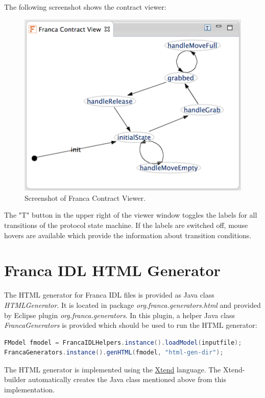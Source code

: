 \documentclass[a4paper,10pt]{scrreprt}
\begin{document}
The following screenshot shows the contract viewer:

\begin{figure}[!ht]
\centering
\includegraphics[width=\textwidth]{images/contractviewer_screenshot.png}
\caption{Screenshot of Franca Contract Viewer.}
\end{figure}

The "T" button in the upper right of the viewer window toggles the labels for
all transitions of the protocol state machine. If the labels are switched off, 
mouse hovers are available which provide the information about transition conditions. 

\section{Franca IDL HTML Generator}
\label{FrancaTooling_Generators}
The HTML generator for Franca IDL files is provided as Java class
\textit{HTMLGenerator}. It is located in package \textit{org.franca.generators.html}
and provided by Eclipse plugin \textit{org.franca.generators}.
In this plugin, a helper Java class \textit{FrancaGenerators} is provided which
should be used to run the HTML generator:


\begin{lstlisting}[language=Java]
FModel fmodel = FrancaIDLHelpers.instance().loadModel(inputfile);
FrancaGenerators.instance().genHTML(fmodel, "html-gen-dir");
\end{lstlisting}

The HTML generator is implemented using the \href{http://www.xtend-lang.org}{Xtend}
language. The Xtend-builder automatically creates the Java class mentioned
above from this implementation. 
\end{document}
